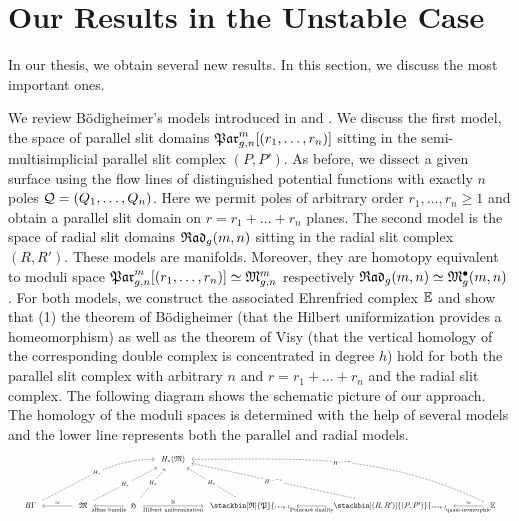 \section{Our Results in the Unstable Case}
In our thesis, we obtain several new results.
In this section, we discuss the most important ones.

We review Bödigheimer's models introduced in \cite{Boedigheimer19901} and \cite{Boedigheimer2006}.
We discuss the first model, the space of parallel slit domains $\Parr$ sitting in the semi-multisimplicial parallel slit complex $(P,P')$.
As before, we dissect a given surface using the flow lines of distinguished potential functions with exactly $n$ poles $\mc Q = (Q_1, \ldots, Q_n)$.
Here we permit poles of arbitrary order $r_1, \ldots, r_n \ge 1$ and obtain a parallel slit domain on $r = r_1 + \ldots + r_n$ planes.
The second model is the space of radial slit domains ${\mathfrak{Rad}_g(m,n)}$ sitting in the radial slit complex $(R,R')$.
These models are manifolds.
Moreover, they are homotopy equivalent to moduli space $\Parr \simeq \Modspc$ respectively ${\mathfrak{Rad}_g(m,n)} \simeq \mathfrak{M}^\bullet_g(m, n)$.
For both models, we construct the associated Ehrenfried complex $\mathbb E$ and show that 
(1) the theorem of Bödigheimer (that the Hilbert uniformization provides a homeomorphism)
as well as the theorem of Visy (that the vertical homology of the corresponding double complex is concentrated in degree $h$) hold for both
the parallel slit complex with arbitrary $n$ and $r = r_1 + \ldots + r_n$ and the radial slit complex.
The following diagram shows the schematic picture of our approach.
The homology of the moduli spaces is determined with the help of several models and the lower line represents both the parallel and radial models.
\[
    \resizebox{\linewidth}{!}{
        \begin{tikzcd}[row sep=10ex, scale=1.3, ampersand replacement=\&]
            \&\&\&\&\&H_\ast(\mathfrak M) \\
            B\Gamma \arrow[<-, shorten <=1ex, shorten >=1ex]{rr}{\simeq} \arrow[dashed, out=25, in=180, shorten <=1ex, shorten >=1ex]{rrrrru}[description]{H_\ast} \&\&
            \mathfrak M \arrow[<-, shorten <=1ex, shorten >=1ex]{rr}[swap]{\text{affine bundle}} \arrow[dashed, shorten <=1ex, shorten >=1ex]{rrru}[description]{H_\ast} \&\&
            \mathfrak H \arrow[shorten <=1ex, shorten >=1ex]{rr}{\cong}[swap]{\text{Hilbert uniformization}} \arrow[dashed, shorten <=1ex, shorten >=1ex]{ru}[description]{H_\ast} \&\&
            \stackbin[\mathfrak R]{\mathfrak P}{\scriptscriptstyle{resp.}} \arrow[<-, shorten <=1ex, shorten >=1ex]{rr}[swap]{\text{Poincaré duality}} \arrow[dashed, shorten <=1ex, shorten >=1ex]{lu}[description]{H_\ast} \&\&
            \stackbin[(R,R')]{(P,P')}{\scriptscriptstyle{resp.}} \arrow[<-, shorten <=1ex, shorten >=1ex]{rr}{\simeq}[swap]{\text{quasi-isomorphic}} \arrow[dashed, shorten <=1ex, shorten >=1ex]{lllu}[description]{H^{\ldots-\ast}} \&\&
            \E \arrow[dashed, out=155, in=0, shorten <=1ex, shorten >=1ex]{lllllu}[description]{H^{\ldots-\ast}}
        \end{tikzcd}
    }
\]
